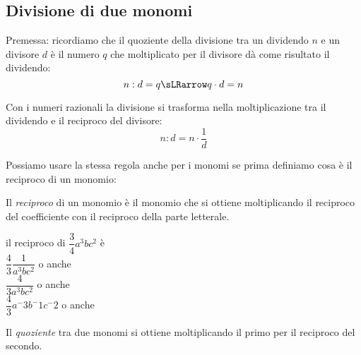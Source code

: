 % 


\subsection{Divisione di due monomi}
\label{subsec:09_monomi_quoziente}

Premessa: ricordiamo che il quoziente della divisione tra un dividendo \(n\) 
e un divisore \(d\) è il numero \(q\) che moltiplicato per il divisore dà come 
risultato il dividendo:
\[n : d = q \sLRarrow q \cdot d = n\]

Con i numeri razionali la divisione si trasforma nella moltiplicazione tra 
il dividendo e il reciproco del divisore:
\[n : d = n \cdot \frac{1}{d}\]

Possiamo usare la stessa regola anche per i monomi se prima definiamo cosa 
è il reciproco di un monomio:

\begin{definizione}
Il \emph{reciproco} di un monomio è il monomio che si ottiene moltiplicando 
il reciproco del coefficiente con il reciproco della parte letterale.
\end{definizione}

\begin{esempio}
 il reciproco di \(\dfrac{3}{4}a^3bc^2\) \quad è\\
\(\dfrac{4}{3}\dfrac{1}{a^3bc^2}\) \quad o anche \\
\(\dfrac{4}{3a^3bc^2}\) \quad o anche \\
\(\dfrac{4}{3}a^-3b^-1c^-2\) \quad o anche \\
\end{esempio}

\begin{definizione}
Il \emph{quoziente} tra due monomi si ottiene moltiplicando il primo per il 
reciproco del secondo.
\end{definizione}

